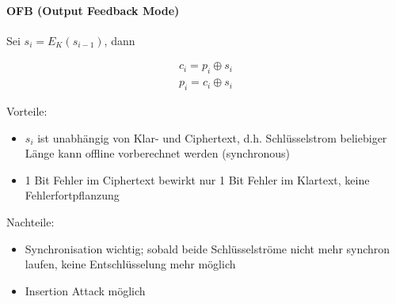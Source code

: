 \paragraph{OFB (Output Feedback Mode)}

Sei $s_i = E_K(s_{i-1})$, dann

\begin{align*}
    c_i = p_i \oplus s_i  \\
    p_i = c_i \oplus s_i
\end{align*}

Vorteile: 
\begin{itemize}
    \item $s_i$ ist unabhängig von Klar- und Ciphertext, d.h. Schlüsselstrom beliebiger Länge kann offline vorberechnet 
    werden (synchronous)
    \item 1 Bit Fehler im Ciphertext bewirkt nur 1 Bit Fehler im Klartext, keine Fehlerfortpflanzung
\end{itemize}


Nachteile: 
\begin{itemize}
    \item Synchronisation wichtig; sobald beide Schlüsselströme nicht mehr synchron laufen, keine Entschlüsselung mehr 
    möglich
    \item Insertion Attack möglich
\end{itemize}


